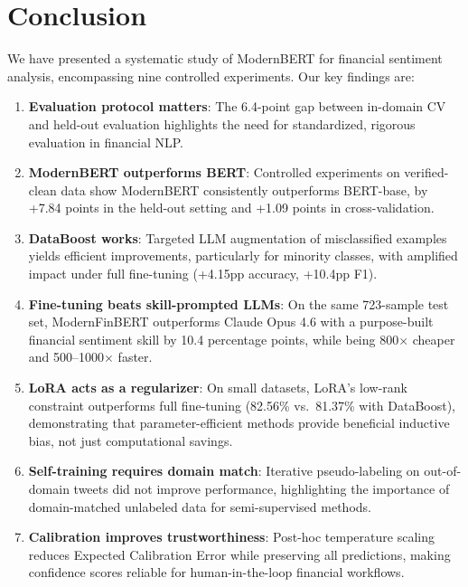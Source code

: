\documentclass[11pt]{article}
\begin{document}
\section{Conclusion}
\label{sec:conclusion}

We have presented a systematic study of ModernBERT for financial sentiment analysis, encompassing nine controlled experiments. Our key findings are:

\begin{enumerate}[nosep]
    \item \textbf{Evaluation protocol matters}: The 6.4-point gap between in-domain CV and held-out evaluation highlights the need for standardized, rigorous evaluation in financial NLP.
    \item \textbf{ModernBERT outperforms BERT}: Controlled experiments on verified-clean data show ModernBERT consistently outperforms BERT-base, by +7.84 points in the held-out setting and +1.09 points in cross-validation.
    \item \textbf{DataBoost works}: Targeted LLM augmentation of misclassified examples yields efficient improvements, particularly for minority classes, with amplified impact under full fine-tuning (+4.15pp accuracy, +10.4pp F1).
    \item \textbf{Fine-tuning beats skill-prompted LLMs}: On the same 723-sample test set, ModernFinBERT outperforms Claude Opus 4.6 with a purpose-built financial sentiment skill by 10.4 percentage points, while being 800$\times$ cheaper and 500--1000$\times$ faster.
    \item \textbf{LoRA acts as a regularizer}: On small datasets, LoRA's low-rank constraint outperforms full fine-tuning (82.56\% vs.\ 81.37\% with DataBoost), demonstrating that parameter-efficient methods provide beneficial inductive bias, not just computational savings.
    \item \textbf{Self-training requires domain match}: Iterative pseudo-labeling on out-of-domain tweets did not improve performance, highlighting the importance of domain-matched unlabeled data for semi-supervised methods.
    \item \textbf{Calibration improves trustworthiness}: Post-hoc temperature scaling reduces Expected Calibration Error while preserving all predictions, making confidence scores reliable for human-in-the-loop financial workflows.
\end{enumerate}
\end{document}
